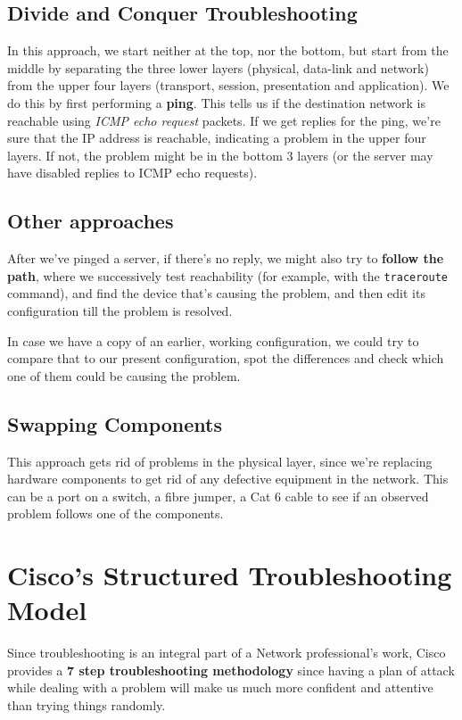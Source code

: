 \subsection{Divide and Conquer Troubleshooting}
In this approach, we start neither at the top, nor the bottom, but start from the middle by separating the three lower layers (physical, data-link and network) from the upper four layers (transport, session, presentation and application). We do this by first performing a \textbf{ping}. This tells us if the destination network is reachable using \textit{ICMP echo request} packets. If we get replies for the ping, we're sure that the IP address is reachable, indicating a problem in the upper four layers. If not, the problem might be in the bottom 3 layers (or the server may have disabled replies to ICMP echo requests).

\subsection{Other approaches}
After we've pinged a server, if there's no reply, we might also try to \textbf{follow the path}, where we successively test reachability (for example, with the \verb|traceroute| command), and find the device that's causing the problem, and then edit its configuration till the problem is resolved. 

In case we have a copy of an earlier, working configuration, we could try to compare that to our present configuration, spot the differences and check which one of them could be causing the problem. 

\subsection{Swapping Components}
This approach gets rid of problems in the physical layer, since we're replacing hardware components to get rid of any defective equipment in the network. This can be a port on a switch, a fibre jumper, a Cat 6 cable to see if an observed problem follows one of the components. 

\section{Cisco's Structured Troubleshooting Model}
Since troubleshooting is an integral part of a Network professional's work, Cisco provides a \textbf{7 step troubleshooting methodology} since having a plan of attack while dealing with a problem will make us much more confident and attentive than trying things randomly. 

